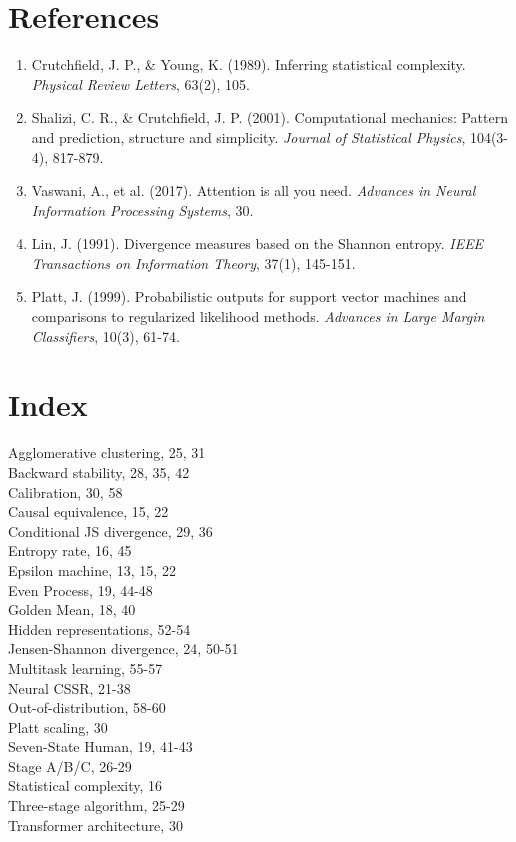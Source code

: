 \documentclass[11pt,a4paper]{report}
\theoremstyle{definition}
\begin{document}
\chapter*{References}

\begin{enumerate}
\item Crutchfield, J. P., \& Young, K. (1989). Inferring statistical complexity. \textit{Physical Review Letters}, 63(2), 105.

\item Shalizi, C. R., \& Crutchfield, J. P. (2001). Computational mechanics: Pattern and prediction, structure and simplicity. \textit{Journal of Statistical Physics}, 104(3-4), 817-879.

\item Vaswani, A., et al. (2017). Attention is all you need. \textit{Advances in Neural Information Processing Systems}, 30.

\item Lin, J. (1991). Divergence measures based on the Shannon entropy. \textit{IEEE Transactions on Information Theory}, 37(1), 145-151.

\item Platt, J. (1999). Probabilistic outputs for support vector machines and comparisons to regularized likelihood methods. \textit{Advances in Large Margin Classifiers}, 10(3), 61-74.
\end{enumerate}

\chapter*{Index}

\noindent
Agglomerative clustering, 25, 31 \\
Backward stability, 28, 35, 42 \\
Calibration, 30, 58 \\
Causal equivalence, 15, 22 \\
Conditional JS divergence, 29, 36 \\
Entropy rate, 16, 45 \\
Epsilon machine, 13, 15, 22 \\
Even Process, 19, 44-48 \\
Golden Mean, 18, 40 \\
Hidden representations, 52-54 \\
Jensen-Shannon divergence, 24, 50-51 \\
Multitask learning, 55-57 \\
Neural CSSR, 21-38 \\
Out-of-distribution, 58-60 \\
Platt scaling, 30 \\
Seven-State Human, 19, 41-43 \\
Stage A/B/C, 26-29 \\
Statistical complexity, 16 \\
Three-stage algorithm, 25-29 \\
Transformer architecture, 30 \\
\end{document}
